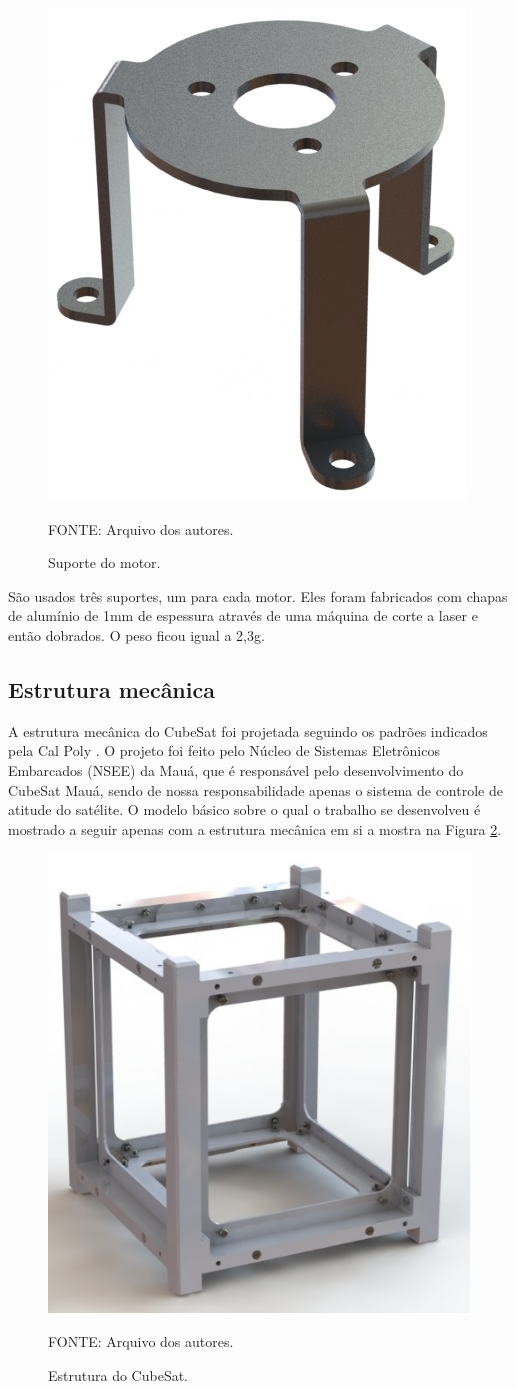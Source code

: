 \documentclass[
	12pt,				%
	openany,			%
	twoside,			%
	a4paper,			%
	english,			%
	french,				%
	spanish,			%
	brazil,				%
	oldfontcommands
	]{abntex2}
\begin{document}
\begin{figure}[th]
	\caption{Suporte do motor.}
	\centering
	\includegraphics[width=0.45\linewidth]{./figs/Motor_Sup}
	
	\begin{small}
		FONTE: Arquivo dos autores.
	\end{small}
	\label{fig:MS}
\end{figure}

\newpage

São usados três suportes, um para cada motor. Eles foram fabricados com chapas de alumínio de 1mm de espessura através de uma máquina de corte a laser e então dobrados. O peso ficou igual a 2,3g.

\subsection{Estrutura mecânica}

A estrutura mecânica do CubeSat foi projetada seguindo os padrões indicados pela Cal Poly \cite{CalPoly}. O projeto foi feito pelo Núcleo de Sistemas Eletrônicos Embarcados (NSEE) da Mauá, que é responsável pelo desenvolvimento do CubeSat Mauá, sendo de nossa responsabilidade apenas o sistema de controle de atitude do satélite. O modelo básico sobre o qual o trabalho se desenvolveu é mostrado a seguir apenas com a estrutura mecânica em si a mostra na Figura \ref{fig:Frame}. %

\begin{figure}[th]
	\caption{Estrutura do CubeSat.}
	\centering
	\includegraphics[width=0.5\linewidth]{./figs/Frame}
	
	\begin{small}
		FONTE: Arquivo dos autores.
	\end{small}
	\label{fig:Frame}
\end{figure}
\end{document}
